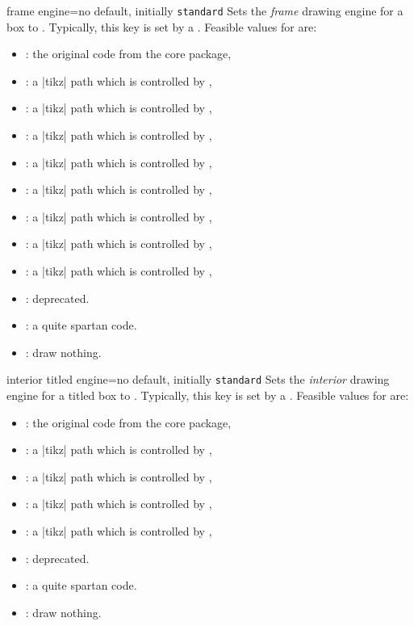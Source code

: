 \begin{docTcbKey}{frame engine}{=}{no default, initially \texttt{standard}}
  Sets the \emph{frame} drawing engine for a box to .
  Typically, this key is set by a .
  Feasible values for  are:
  \begin{itemize}
  \item{}: the original code from the core package,
  \item{}: a |tikz| path which is controlled by ,
  \item{}: a |tikz| path which is controlled by ,
  \item{}: a |tikz| path which is controlled by ,
  \item{}: a |tikz| path which is controlled by ,
  \item{}: a |tikz| path which is controlled by ,
  \item{}: a |tikz| path which is controlled by ,
  \item{}: a |tikz| path which is controlled by ,
  \item{}: a |tikz| path which is controlled by ,
  \item{}: deprecated.
  \item{}: a quite spartan code.
  \item{}: draw nothing.
\end{itemize}
\end{docTcbKey}

\begin{docTcbKey}{interior titled engine}{=}{no default, initially \texttt{standard}}
  Sets the \emph{interior} drawing engine for a titled box to .
  Typically, this key is set by a .
  Feasible values for  are:
  \begin{itemize}
  \item{}: the original code from the core package,
  \item{}: a |tikz| path which is controlled by ,
  \item{}: a |tikz| path which is controlled by ,
  \item{}: a |tikz| path which is controlled by ,
  \item{}: a |tikz| path which is controlled by ,
  \item{}: deprecated.
  \item{}: a quite spartan code.
  \item{}: draw nothing.
  \end{itemize}
\end{docTcbKey}

